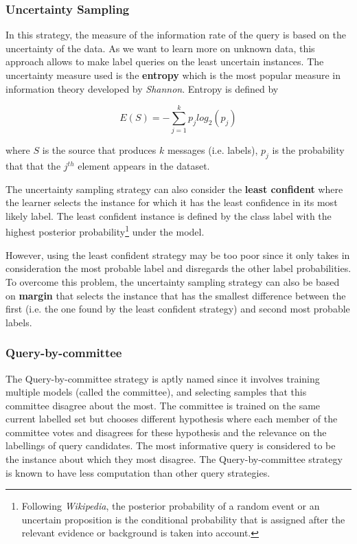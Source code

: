 \documentclass[11pt, openany]{report}
\theoremstyle{plain}
\theoremstyle{definition}
\theoremstyle{remark}
\begin{document}
\subsubsection{Uncertainty Sampling}
In this strategy, the measure of the information rate of the query is based on the uncertainty of   the data. As we want to learn more on unknown data, this approach allows to make label queries on the least uncertain instances. The uncertainty measure used is the \textbf{entropy} which is the most popular measure in information theory developed by \textit{Shannon}. Entropy is defined by

$$ E(S) = - \sum_{j=1}^{k} p_j log_{2}(p_j) $$ 

where $S$ is the source that produces $k$ messages (i.e. labels), $p_j$ is the probability that that the $j^{th}$ element appears in the dataset. 

The uncertainty sampling strategy can also consider the \textbf{least confident} where the learner selects the instance for which it has the least confidence in its most likely label. The least confident instance is defined by the class label with the highest posterior probability\footnote{Following \textit{Wikipedia}, the posterior probability of a random event or an uncertain proposition is the conditional probability that is assigned after the relevant evidence or background is taken into account.} under the model. 

However, using the least confident strategy may be too poor since it only takes in consideration the most probable label and disregards the other label probabilities. To overcome this problem, the uncertainty sampling strategy can also be based on \textbf{margin} that selects the instance that has the smallest difference between the first (i.e. the one found by the least confident strategy) and second most probable labels. 


\subsubsection{Query-by-committee}
The Query-by-committee strategy is aptly named since it involves training multiple models (called the committee), and selecting samples that this committee disagree about the most. The committee is trained on the same current labelled set but chooses different hypothesis where each member of the committee votes and disagrees for these hypothesis and the relevance on the labellings of query candidates.  The most informative query is considered to be the instance about which they most disagree. The Query-by-committee strategy is known to have less computation than other query strategies.
\end{document}
